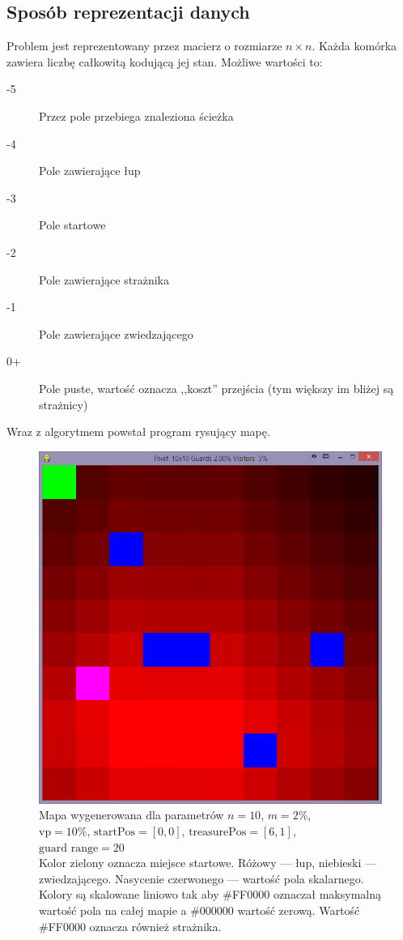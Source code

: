 \documentclass[12pt]{article}
\begin{document}
\subsection{Sposób reprezentacji danych}
Problem jest reprezentowany przez macierz o rozmiarze $n \times n$. Każda komórka zawiera liczbę całkowitą kodującą jej stan. Możliwe wartości to:
\begin{description}
\item[-5] Przez pole przebiega znaleziona ścieżka
\item[-4] Pole zawierające łup
\item[-3] Pole startowe
\item[-2] Pole zawierające strażnika
\item[-1] Pole zawierające zwiedzającego
\item[0+] Pole puste, wartość oznacza ,,koszt'' przejścia (tym większy im bliżej są strażnicy)
\end{description}

Wraz z algorytmem powstał program rysujący mapę.
\begin{figure}
\includegraphics[width=\textwidth,keepaspectratio=true]{Clipboard01.png} 
\caption[]{Mapa wygenerowana dla parametrów $n=10$, $m=2\% $,\\\hspace{\textwidth} $\text{vp}=10\%$, $\text{startPos}=[0,0]$, $\text{treasurePos}=[6,1]$, $\text{guard range}=20$ \\\hspace{\textwidth} Kolor zielony oznacza miejsce startowe. Różowy --- łup, niebieski --- zwiedzającego. Nasycenie czerwonego --- wartość pola skalarnego. Kolory są skalowane liniowo tak aby \#FF0000 oznaczał maksymalną wartość pola na całej mapie a \#000000 wartość zerową. Wartość \#FF0000 oznacza również strażnika. }
\end{figure}
\end{document}
